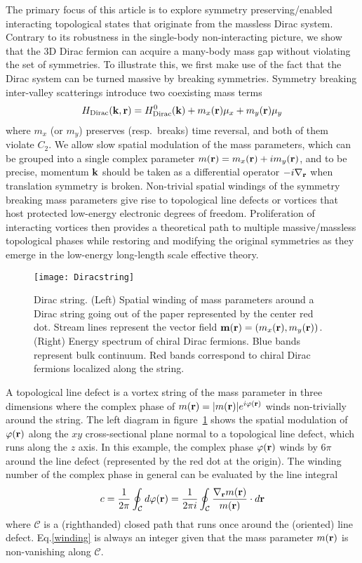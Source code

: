 The primary focus of this article is to explore symmetry preserving/enabled interacting topological states that originate from the massless Dirac system. Contrary to its robustness in the single-body non-interacting picture, we show that the 3D Dirac fermion can acquire a many-body mass gap without violating the set of symmetries. To illustrate this, we first make use of the fact that the Dirac system can be turned massive by breaking symmetries. Symmetry breaking inter-valley scatterings introduce two coexisting mass terms \begin{align}H_{\mathrm{Dirac}}({\bf k},{\bf r})=H_{\mathrm{Dirac}}^0({\bf k})+m_x({\bf r})\mu_x+m_y({\bf r})\mu_y\label{DiracHam}\end{align} where $m_x$ (or $m_y$) preserves (resp.~breaks) time reversal, and both of them violate $C_2$. We allow slow spatial modulation of the mass parameters, which can be grouped into a single complex parameter $m({\bf r})=m_x({\bf r})+im_y({\bf r})$, and to be precise, momentum ${\bf k}$ should be taken as a differential operator $-i\nabla_{\bf r}$ when translation symmetry is broken. Non-trivial spatial windings of the symmetry breaking mass parameters give rise to topological line defects or vortices that host protected low-energy electronic degrees of freedom. Proliferation of interacting vortices then provides a theoretical path to multiple massive/massless topological phases while restoring and modifying the original symmetries as they emerge in the low-energy long-length scale effective theory.

\begin{figure}[htbp]
\centering\texttt{[image: Diracstring]}
\caption{Dirac string. (Left) Spatial winding of mass parameters around a Dirac string going out of the paper represented by the center red dot. Stream lines represent the vector field ${\bf m}({\bf r})=(m_x({\bf r}),m_y({\bf r}))$. (Right) Energy spectrum of chiral Dirac fermions. Blue bands represent bulk continuum. Red bands correspond to chiral Dirac fermions localized along the string.}\label{fig:Diracstring}
\end{figure}

A topological line defect is a vortex string of the mass parameter in three dimensions where the complex phase of $m({\bf r})=|m({\bf r})|e^{i\varphi({\bf r})}$ winds non-trivially around the string. The left diagram in figure~\ref{fig:Diracstring} shows the spatial modulation of $\varphi({\bf r})$ along the $xy$ cross-sectional plane normal to a topological line defect, which runs along the $z$ axis. In this example, the complex phase $\varphi({\bf r})$ winds by $6\pi$ around the line defect (represented by the red dot at the origin). The winding number of the complex phase in general can be evaluated by the line integral \begin{align}c=\frac{1}{2\pi}\oint_\mathcal{C}d\varphi({\bf r})=\frac{1}{2\pi i}\oint_\mathcal{C}\frac{\nabla_{\bf r}m({\bf r})}{m({\bf r})}\cdot d{\bf r}\label{winding}\end{align} where $\mathcal{C}$ is a (righthanded) closed path that runs once around the (oriented) line defect. Eq.\eqref{winding} is always an integer given that the mass parameter $m({\bf r})$ is non-vanishing along $\mathcal{C}$.

